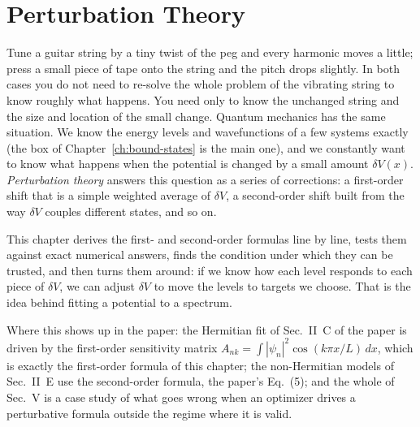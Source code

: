 \chapter{Perturbation Theory}\label{ch:perturbation}

\begin{chapterintro}
Tune a guitar string by a tiny twist of the peg and every harmonic moves a little; press a small piece of tape onto the string and the pitch drops slightly. In both cases you do not need to re-solve the whole problem of the vibrating string to know roughly what happens. You need only to know the unchanged string and the size and location of the small change. Quantum mechanics has the same situation. We know the energy levels and wavefunctions of a few systems exactly (the box of Chapter~\ref{ch:bound-states} is the main one), and we constantly want to know what happens when the potential is changed by a small amount $\delta V(x)$. \emph{Perturbation theory} answers this question as a series of corrections: a first-order shift that is a simple weighted average of $\delta V$, a second-order shift built from the way $\delta V$ couples different states, and so on.

This chapter derives the first- and second-order formulas line by line, tests them against exact numerical answers, finds the condition under which they can be trusted, and then turns them around: if we know how each level responds to each piece of $\delta V$, we can adjust $\delta V$ to move the levels to targets we choose. That is the idea behind fitting a potential to a spectrum.

Where this shows up in the paper: the Hermitian fit of Sec.~II~C of the paper \cite{soniR1} is driven by the first-order sensitivity matrix $A_{nk}=\int|\psi_n|^2\cos(k\pi x/L)\,dx$, which is exactly the first-order formula of this chapter; the non-Hermitian models of Sec.~II~E use the second-order formula, the paper's Eq.~(5); and the whole of Sec.~V is a case study of what goes wrong when an optimizer drives a perturbative formula outside the regime where it is valid.
\end{chapterintro}

